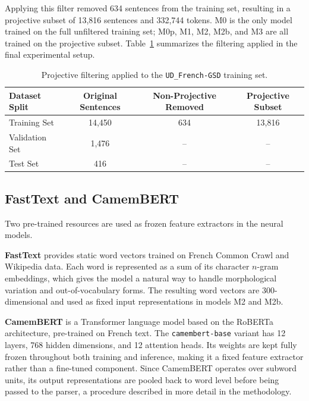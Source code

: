 \documentclass[12pt,letterpaper]{article}
\begin{document}
Applying this filter removed 634 sentences from the training set, resulting in a projective subset of 13,816 sentences and 332,744 tokens. M0 is the only model trained on the full unfiltered training set; M0p, M1, M2, M2b, and M3 are all trained on the projective subset. Table~\ref{tab:dataset_filtering_stats} summarizes the filtering applied in the final experimental setup.

\begin{table}[ht]
\centering
\caption{Projective filtering applied to the \texttt{UD\_French-GSD} training set.}
\label{tab:dataset_filtering_stats}
\small
\begin{tabular}{lccc}
\hline
\textbf{Dataset Split} & \textbf{Original Sentences} & \textbf{Non-Projective Removed} & \textbf{Projective Subset} \\ \hline
Training Set           & 14,450                      & 634                             & 13,816                     \\
Validation Set         & 1,476                       & \multicolumn{1}{c}{--}          & \multicolumn{1}{c}{--}     \\
Test Set               & 416                         & \multicolumn{1}{c}{--}          & \multicolumn{1}{c}{--}     \\ \hline
\end{tabular}
\end{table}
\FloatBarrier
\subsection{FastText and CamemBERT}
\label{subsec:pretrained_resources}

Two pre-trained resources are used as frozen feature extractors in the neural models.

\textbf{FastText} \cite{bojanowski2017enriching} provides static word vectors trained on French Common Crawl and Wikipedia data. Each word is represented as a sum of its character $n$-gram embeddings, which gives the model a natural way to handle morphological variation and out-of-vocabulary forms. The resulting word vectors are 300-dimensional and used as fixed input representations in models M2 and M2b.

\textbf{CamemBERT} \cite{martin2020camembert} is a Transformer language model based on the RoBERTa architecture, pre-trained on French text. The \texttt{camembert-base} variant has 12 layers, 768 hidden dimensions, and 12 attention heads. Its weights are kept fully frozen throughout both training and inference, making it a fixed feature extractor rather than a fine-tuned component. Since CamemBERT operates over subword units, its output representations are pooled back to word level before being passed to the parser, a procedure described in more detail in the methodology.
\end{document}
